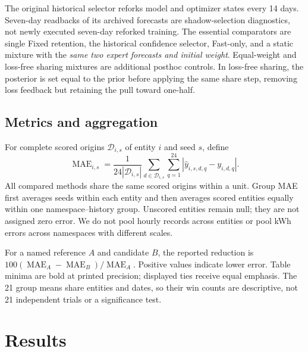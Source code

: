 \documentclass[pdflatex,iicol,sn-mathphys-num]{sn-jnl}
\begin{document}
The original historical selector reforks model and optimizer states every 14 days. Seven-day readbacks of its archived forecasts are shadow-selection diagnostics, not newly executed seven-day reforked training. The essential comparators are single Fixed retention, the historical confidence selector, Fast-only, and a static mixture with the \emph{same two expert forecasts and initial weight}. Equal-weight and loss-free sharing mixtures are additional posthoc controls. In loss-free sharing, the posterior is set equal to the prior before applying the same share step, removing loss feedback but retaining the pull toward one-half.

\subsection{Metrics and aggregation}
For complete scored origins $\mathcal D_{i,s}$ of entity $i$ and seed $s$, define
\begin{equation}
\operatorname{MAE}_{i,s}=\frac{1}{24|\mathcal D_{i,s}|}
\sum_{d\in\mathcal D_{i,s}}\sum_{q=1}^{24}|\hat y_{i,s,d,q}-y_{i,d,q}|.
\label{eq:metric}\end{equation}
All compared methods share the same scored origins within a unit. Group MAE first averages seeds within each entity and then averages scored entities equally within one namespace--history group. Unscored entities remain null; they are not assigned zero error. We do not pool hourly records across entities or pool kWh errors across namespaces with different scales.

For a named reference $A$ and candidate $B$, the reported reduction is $100(\operatorname{MAE}_A-\operatorname{MAE}_B)/\operatorname{MAE}_A$. Positive values indicate lower error. Table minima are bold at printed precision; displayed ties receive equal emphasis. The 21 group means share entities and dates, so their win counts are descriptive, not 21 independent trials or a significance test.

\section{Results}
\end{document}
